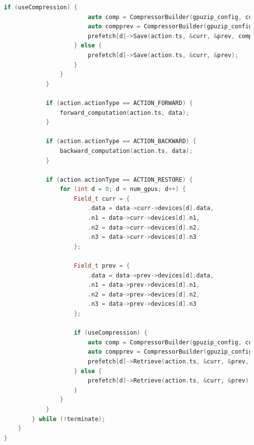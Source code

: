 \documentclass[Ingles]{ic-tese-v3}
\begin{document}
\begin{lstlisting}[language=C++, caption={Example of multi-GPU adjoint computation with GPUZIP}, label={lst:adjoint}]
                    if (useCompression) {
                        auto comp = CompressorBuilder(gpuzip_config, curr.n1, curr.n2, curr.n3);
                        auto compprev = CompressorBuilder(gpuzip_config, prev.n1, prev.n2, prev.n3);
                        prefetch[d]->Save(action.ts, &curr, &prev, comp.get(), compprev.get());
                    } else {
                        prefetch[d]->Save(action.ts, &curr, &prev);
                    }
                }
            }

            if (action.actionType == ACTION_FORWARD) {
                forward_computation(action.ts, data);
            }

            if (action.actionType == ACTION_BACKWARD) {
                backward_computation(action.ts, data);
            }

            if (action.actionType == ACTION_RESTORE) {
                for (int d = 0; d < num_gpus; d++) {
                    Field_t curr = {
                        .data = data->curr->devices[d].data,
                        .n1 = data->curr->devices[d].n1,
                        .n2 = data->curr->devices[d].n2,
                        .n3 = data->curr->devices[d].n3
                    };

                    Field_t prev = {
                        .data = data->prev->devices[d].data,
                        .n1 = data->prev->devices[d].n1,
                        .n2 = data->prev->devices[d].n2,
                        .n3 = data->prev->devices[d].n3
                    };

                    if (useCompression) {
                        auto comp = CompressorBuilder(gpuzip_config, curr.n1, curr.n2, curr.n3);
                        auto compprev = CompressorBuilder(gpuzip_config, prev.n1, prev.n2, prev.n3);
                        prefetch[d]->Retrieve(action.ts, &curr, &prev, comp.get(), compprev.get());
                    } else {
                        prefetch[d]->Retrieve(action.ts, &curr, &prev);
                    }
                }
            }
        } while (!terminate);
    }
}
\end{lstlisting}

\clearpage



\end{document}
